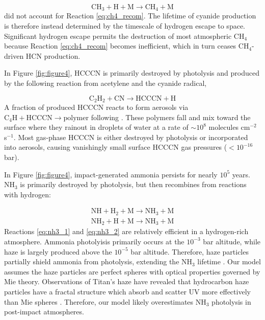 \begin{equation} \label{eq:ch4_recom}
  \mathrm{CH_3} + \mathrm{H} + \mathrm{M} \rightarrow \mathrm{CH_4} + \mathrm{M}  
\end{equation}
\citet{Zahnle_2020} did not account for Reaction \ref{eq:ch4_recom}. The lifetime of cyanide production is therefore instead determined by the timescale of hydrogen escape to space. Significant hydrogen escape permits the destruction of most atmospheric CH$_4$ because Reaction \ref{eq:ch4_recom} becomes inefficient, which in turn ceases CH$_4$-driven HCN production.

In Figure \ref{fig:figure4}, HCCCN is primarily destroyed by photolysis and produced by the following reaction from acetylene and the cyanide radical,

\begin{equation} \label{eq:hcccn}
  \mathrm{C_2H_2} + \mathrm{CN} \rightarrow \mathrm{HCCCN} + \mathrm{H}  
\end{equation}
A fraction of produced HCCCN reacts to form aerosols via $\mathrm{C_4H} + \mathrm{HCCCN} \rightarrow \mathrm{polymer}$ following \citet{Lavvas_2008}. These polymers fall and mix toward the surface where they rainout in droplets of water at a rate of $\sim 10^{8}$ molecules cm$^{-2}$ s$^{-1}$. Most gas-phase HCCCN is either destroyed by photolysis or incorporated into aerosols, causing vanishingly small surface HCCCN gas pressures ($< 10^{-{16}}$ bar).

In Figure \ref{fig:figure4}, impact-generated ammonia persists for nearly $10^5$ years. NH$_3$ is primarily destroyed by photolysis, but then recombines from reactions with hydrogen:

\begin{gather} 
  \mathrm{NH} + \mathrm{H_2} + \mathrm{M} \rightarrow \mathrm{NH_3} + \mathrm{M} \label{eq:nh3_1} 
  \\
  \mathrm{NH_2} + \mathrm{H} + \mathrm{M} \rightarrow \mathrm{NH_3} + \mathrm{M} \label{eq:nh3_2}
\end{gather}
Reactions \ref{eq:nh3_1} and \ref{eq:nh3_2} are relatively efficient in a hydrogen-rich atmosphere. Ammonia photolyisis primarily occurs at the $10^{-3}$ bar altitude, while haze is largely produced above the $10^{-5}$ bar altitude. Therefore, haze particles partially shield ammonia from photolysis, extending the NH$_3$ lifetime \citep{Sagan_1997}. Our model assumes the haze particles are perfect spheres with optical properties governed by Mie theory. Observations of Titan's haze have revealed that hydrocarbon haze particles have a fractal structure which absorb and scatter UV more effectively than Mie spheres \citep{Wolf_2010}. Therefore, our model likely overestimates NH$_3$ photolysis in post-impact atmospheres. 

